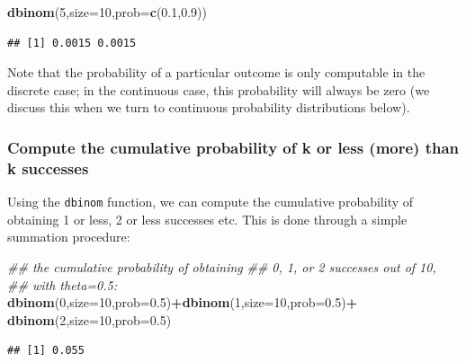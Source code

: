 \documentclass[12pt,]{krantz}
\newenvironment{Shaded}{\begin{snugshade}}{\end{snugshade}}
\newcommand{\CommentTok}[1]{\textcolor[rgb]{0.56,0.35,0.01}{\textit{#1}}}
\newcommand{\DataTypeTok}[1]{\textcolor[rgb]{0.13,0.29,0.53}{#1}}
\newcommand{\DecValTok}[1]{\textcolor[rgb]{0.00,0.00,0.81}{#1}}
\newcommand{\FloatTok}[1]{\textcolor[rgb]{0.00,0.00,0.81}{#1}}
\newcommand{\KeywordTok}[1]{\textcolor[rgb]{0.13,0.29,0.53}{\textbf{#1}}}
\newcommand{\NormalTok}[1]{#1}
\newcommand{\OperatorTok}[1]{\textcolor[rgb]{0.81,0.36,0.00}{\textbf{#1}}}
\newcommand{\StringTok}[1]{\textcolor[rgb]{0.31,0.60,0.02}{#1}}
\theoremstyle{definition}
\theoremstyle{definition}
\theoremstyle{definition}
\theoremstyle{remark}
\begin{document}
\begin{Shaded}
\begin{Highlighting}[]
\KeywordTok{dbinom}\NormalTok{(}\DecValTok{5}\NormalTok{,}\DataTypeTok{size=}\DecValTok{10}\NormalTok{,}\DataTypeTok{prob=}\KeywordTok{c}\NormalTok{(}\FloatTok{0.1}\NormalTok{,}\FloatTok{0.9}\NormalTok{))}
\end{Highlighting}
\end{Shaded}

\begin{verbatim}
## [1] 0.0015 0.0015
\end{verbatim}

Note that the probability of a particular outcome is only computable in the discrete case; in the continuous case, this probability will always be zero (we discuss this when we turn to continuous probability distributions below).

\hypertarget{compute-the-cumulative-probability-of-k-or-less-more-than-k-successes}{%
\subsubsection{Compute the cumulative probability of k or less (more) than k successes}\label{compute-the-cumulative-probability-of-k-or-less-more-than-k-successes}}

Using the \texttt{dbinom} function, we can compute the cumulative probability of obtaining 1 or less, 2 or less successes etc. This is done through a simple summation procedure:

\begin{Shaded}
\begin{Highlighting}[]
\CommentTok{## the cumulative probability of obtaining}
\CommentTok{## 0, 1, or 2 successes out of 10,}
\CommentTok{## with theta=0.5:}
\KeywordTok{dbinom}\NormalTok{(}\DecValTok{0}\NormalTok{,}\DataTypeTok{size=}\DecValTok{10}\NormalTok{,}\DataTypeTok{prob=}\FloatTok{0.5}\NormalTok{)}\OperatorTok{+}\KeywordTok{dbinom}\NormalTok{(}\DecValTok{1}\NormalTok{,}\DataTypeTok{size=}\DecValTok{10}\NormalTok{,}\DataTypeTok{prob=}\FloatTok{0.5}\NormalTok{)}\OperatorTok{+}
\StringTok{  }\KeywordTok{dbinom}\NormalTok{(}\DecValTok{2}\NormalTok{,}\DataTypeTok{size=}\DecValTok{10}\NormalTok{,}\DataTypeTok{prob=}\FloatTok{0.5}\NormalTok{)}
\end{Highlighting}
\end{Shaded}

\begin{verbatim}
## [1] 0.055
\end{verbatim}
\end{document}
